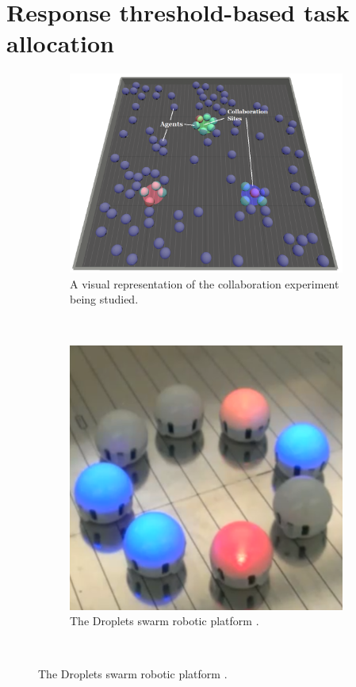 \documentclass{TeXstyles/DARS/svmult}  %
\begin{document}
\section{Response threshold-based task allocation}\label{sec:expsetup}
\begin{figure}[!htb]
\centering\begin{subfigure}{.5\textwidth}
\centering\includegraphics[width=1.0\textwidth]{figures/setup.png}
\caption{A visual representation of the collaboration experiment being studied.\label{fig:setup}}
\end{subfigure}~
\centering\begin{subfigure}{.5\textwidth}
\centering\includegraphics[width=1.0\textwidth]{figures/droplets.png}
\caption{The Droplets swarm robotic platform \cite{farrow14,klingner14}.\label{fig:droplet}}
\end{subfigure}~
\end{figure}
\end{document}

